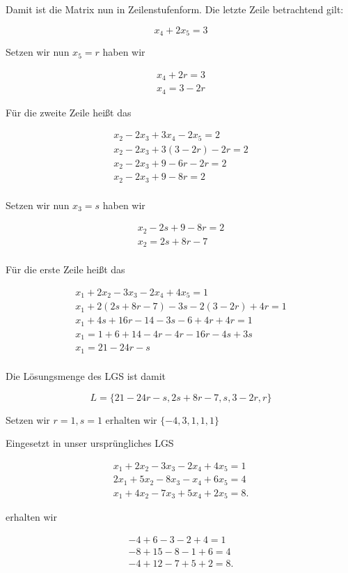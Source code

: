 \documentclass{article}
\begin{document}
Damit ist die Matrix nun in Zeilenstufenform. Die letzte Zeile betrachtend gilt:

\[
x_{4} + 2x_{5} = 3
\]

Setzen wir nun \(x_{5} = r\) haben wir

\[
\begin{split}
x_{4} + 2r = 3 \\
x_{4} = 3 - 2r
\end{split}
\]

Für die zweite Zeile heißt das

\[
\begin{split}
x_{2} - 2x_{3} + 3x_{4} - 2x_{5} = 2 \\
x_{2} - 2x_{3} + 3(3 - 2r) - 2r = 2 \\
x_{2} - 2x_{3} + 9 - 6r - 2r = 2 \\
x_{2} - 2x_{3} + 9 - 8r = 2 \\
\end{split}
\]

Setzen wir nun \(x_{3} = s\) haben wir

\[
\begin{split}
x_{2} - 2s + 9 - 8r = 2 \\
x_{2} = 2s + 8r - 7 \\
\end{split}
\]

Für die erste Zeile heißt das

\[
\begin{split}
x_{1} + 2x_{2} - 3x_{3} - 2x_{4} + 4x_{5} = 1 \\
x_{1} + 2(2s + 8r - 7) - 3s - 2(3 - 2r) + 4r = 1 \\
x_{1} + 4s + 16r - 14 - 3s - 6 + 4r + 4r = 1 \\
x_{1} = 1 + 6 + 14 - 4r - 4r - 16r - 4s + 3s \\
x_{1} = 21 - 24r - s \\
\end{split}
\]

Die Lösungsmenge des LGS ist damit

\[
L = \{21 - 24r - s, 2s + 8r - 7, s, 3 - 2r, r\}
\]

Setzen wir \(r = 1, s = 1\) erhalten wir \(\{-4, 3, 1, 1, 1\}\)

Eingesetzt in unser ursprüngliches LGS

\[
\begin{split}
x_{1} + 2x_{2} - 3x_{3} - 2x_{4} + 4x_{5} = 1 \\
2x_{1} + 5x_{2} - 8x_{3} - x_{4} + 6x_{5} = 4 \\
x_{1} + 4x_{2} - 7x_{3} + 5x_{4} + 2x_{5} = 8.
\end{split}
\]

erhalten wir

\[
\begin{split}
-4 + 6 - 3 - 2 + 4 = 1 \\
-8 + 15 - 8 - 1 + 6 = 4 \\
-4 + 12 - 7 + 5 + 2 = 8.
\end{split}
\]
\end{document}
